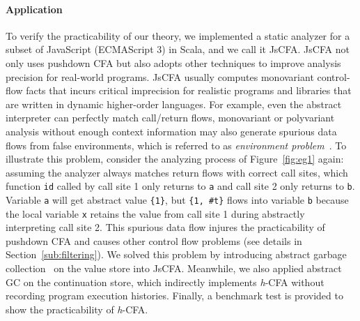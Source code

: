 \documentclass[12pt]{report}
\begin{document}
\paragraph{Application}
To verify the practicability of our theory, we implemented a static analyzer for a subset of JavaScript (ECMAScript 3) in Scala, and we call it JsCFA\@.
JsCFA not only uses pushdown CFA but also adopts other techniques to improve analysis precision for real-world programs.
JsCFA usually computes monovariant control-flow facts that incurs critical imprecision for realistic programs and libraries that are written in dynamic higher-order languages.
For example, even the abstract interpreter can perfectly match call/return flows, monovariant or polyvariant analysis without enough context information may also generate spurious data flows from false environments, which is referred to as \emph{environment problem}~\cite{shivers1991control, might2007environment}.
To illustrate this problem, consider the analyzing process of Figure~\ref{fig:eg1} again: assuming the analyzer always matches return flows with correct call sites, which function \verb|id| called by call site 1 only returns to \verb|a| and call site 2 only returns to \verb|b|.
Variable \verb|a| will get abstract value \verb|{1}|, but \verb|{1, #t}| flows into variable \verb|b| because the local variable \verb|x| retains the value from call site 1 during abstractly interpreting call site 2.
This spurious data flow injures the practicability of pushdown CFA and causes other control flow problems (see details in Section~\ref{sub:filtering}).
We solved this problem by introducing abstract garbage collection~\cite{might2006improving} on the value store into JsCFA\@.
Meanwhile, we also applied abstract GC on the continuation store, which indirectly implements \textit{h}-CFA without recording program execution histories.
Finally, a benchmark test is provided to show the practicability of \textit{h}-CFA\@.
\end{document}
